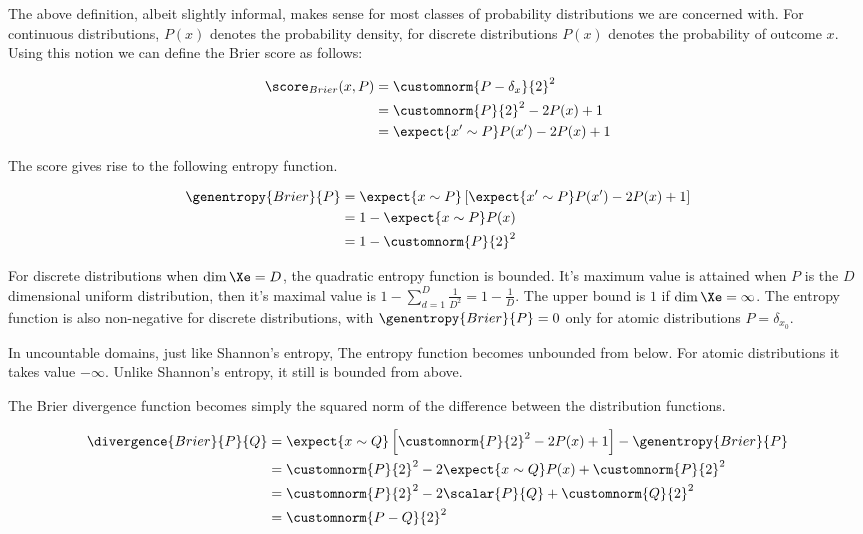 The above definition, albeit slightly informal, makes sense for most classes of probability distributions we are concerned with. For continuous distributions, $P(x)$ denotes the probability density, for discrete distributions $P(x)$ denotes the probability of outcome $x$. Using this notion we can define the Brier score as follows:

\begin{align}
	\score_{Brier}(x,P) &= \customnorm{P - \delta_{x}}{2}^2\\
		&= \customnorm{P}{2}^{2} - 2P(x)  + 1\\
		&= \expect{x' \sim P} P(x') - 2P(x) + 1\\
\end{align}

The score gives rise to the following entropy function.

\begin{align}
	\genentropy{Brier}{P} &= \expect{x \sim P}\left[\expect{x' \sim P} P(x') - 2P(x) + 1\right]\\
		&= 1 -\expect{x \sim P} P(x)\\
		&= 1 - \customnorm{P}{2}^2
\end{align}

For discrete distributions when $\dim \Xe = D$, the quadratic entropy function is bounded. It's maximum value is attained when $P$ is the $D$ dimensional uniform distribution, then it's maximal value is  $1 - \sum_{d=1}^{D}\frac{1}{D^2} = 1 - \frac{1}{D}$. The upper bound is $1$ if $\dim \Xe = \infty$. The entropy function is also non-negative for discrete distributions, with $\genentropy{Brier}{P}=0$ only for atomic distributions $P=\delta_{x_0}$.

In uncountable domains, just like Shannon's entropy, The entropy function becomes unbounded from below. For atomic distributions it takes value $-\infty$. Unlike Shannon's entropy, it still is bounded from above.

The Brier divergence function becomes simply the squared norm of the difference between the distribution functions.

\begin{align}
	\divergence{Brier}{P}{Q} &= \expect{x \sim Q}\left[\customnorm{P}{2}^2 - 2P(x) + 1\right] - \genentropy{Brier}{P} \\
		&= \customnorm{P}{2}^2 -2 \expect{x \sim Q} P(x) + \customnorm{P}{2}^2 \\
		&= \customnorm{P}{2}^2 - 2\scalar{P}{Q} + \customnorm{Q}{2}^2\\
		&= \customnorm{P-Q}{2}^2
\end{align}


